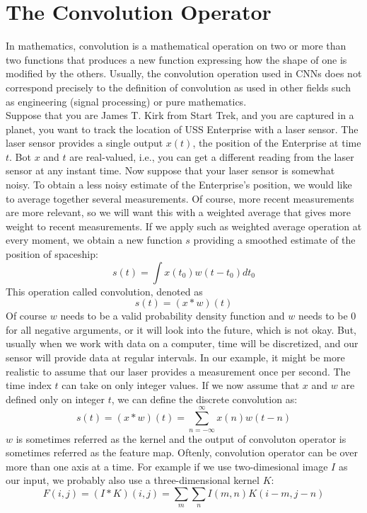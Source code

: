 \documentclass[11pt]{article}
\begin{document}
\section{The Convolution Operator}
\hspace*{1cm} In mathematics, convolution is a mathematical operation on two or more than two functions that produces a new function expressing how the shape of one is modified by the others. Usually, the convolution operation used in CNNs does not correspond precisely to the definition of convolution as used in other fields such as engineering (signal processing) or pure mathematics.\\
Suppose that you are James T. Kirk from Start Trek, and you are captured in a planet, you want to track the location of USS Enterprise with a laser sensor. The laser sensor provides a single output $x(t)$, the position of the Enterprise at time $t$. Bot $x$ and $t$ are real-valued, i.e., you can get a different reading from the laser sensor at any instant time. Now suppose that your laser sensor is somewhat noisy. To obtain a less noisy estimate of the Enterprise's position, we would like to average together several measurements. Of course, more recent measurements are more relevant, so we will want this with a weighted average that gives more weight to recent measurements. If we apply such as weighted average operation at every moment, we obtain a new function $s$ providing a smoothed estimate of the position of spaceship:
$$ s(t) = \int x(t_0)w(t-t_0)dt_0$$
This operation called convolution, denoted as 
$$s(t) = (x \ast w)(t)$$
Of course $w$ needs to be a valid probability density function and $w$ needs to be 0 for all negative arguments, or it will look into the future, which is not okay. But, usually when we work with data on a computer, time will be discretized, and our sensor will provide data at regular intervals. In our example, it might be more realistic to assume that our laser provides a measurement once per second. The time index $t$ can take on only integer values. If we now assume that $x$ and $w$ are defined only on integer $t$, we can define the discrete convolution as:
$$s(t) = (x \ast w)(t) = \sum_{n= -\infty}^{\infty} x(n)w(t-n)$$
$w$ is sometimes referred as the kernel and the output of convoluton operator is sometimes referred as the feature map.
Oftenly, convolution operator can be over more than one axis at a time. For example if we use two-dimesional image $I$ as our input, we probably also use a three-dimensional kernel $K$:
$$F(i,j) = (I \ast K)(i,j)=\sum_{m}\sum_{n} I(m,n)K(i-m,j-n)$$
\end{document}
